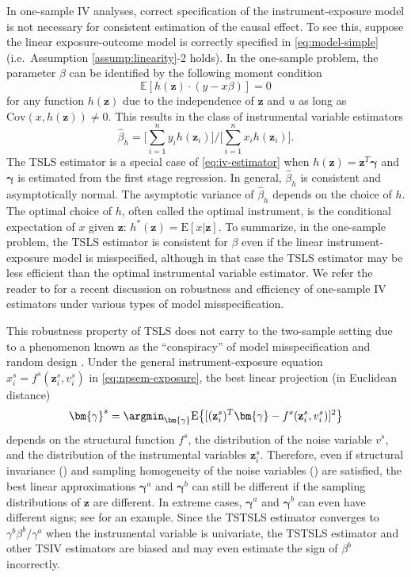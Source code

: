 \documentclass[preprint]{imsart}
\begin{document}
In one-sample IV analyses, correct specification of
the instrument-exposure model is not necessary for consistent
estimation of the causal effect. To see this, suppose the linear
exposure-outcome model is correctly specified in
\eqref{eq:model-simple} (i.e.\ Assumption \ref{assump:linearity}-2
holds). In the one-sample problem, the parameter $\beta$ can be
identified by the following moment condition
\[
\mathbb{E}[h(\mathbf{z}) \cdot (y - x \beta)] = 0
\]
for any function $h(\mathbf{z})$ due to the independence of
$\mathbf{z}$ and $u$ as long as $\mathrm{Cov}(x, h(\mathbf{z})) \ne
0$. This results in the class of instrumental
variable estimators
\begin{equation} \label{eq:iv-estimator}
  \hat{\beta}_h = \Big[\sum_{i=1}^n y_i
  h(\mathbf{z}_i)\Big] \Big/ \Big[\sum_{i=1}^n x_i h(\mathbf{z}_i)\Big].
\end{equation}
The TSLS estimator is a special case of \eqref{eq:iv-estimator} when
$h(\mathbf{z}) = \mathbf{z}^T \bm{\gamma}$ and $\bm{\gamma}$ is estimated from the first
stage regression. In general, $\hat{\beta}_h$ is consistent and
asymptotically normal. The asymptotic variance of $\hat{\beta}_h$ depends on the choice
of $h$. The optimal choice of $h$, often called the optimal
instrument, is the conditional expectation of $x$ given $\mathbf{z}$:
$h^{*}(\mathbf{z}) = \mathrm{E}[x|\mathbf{z}]$. To summarize, in the
one-sample problem, the TSLS estimator is consistent for $\beta$ even
if the linear instrument-exposure model is misspecified, although in
that case the TSLS estimator may be less efficient than the optimal instrumental
variable estimator. We refer the reader to
\citet{vansteelandt2015robustness} for a recent discussion on
robustness and efficiency of one-sample IV estimators under various
types of model misspecification.

This robustness property of TSLS does not carry to the two-sample
setting due to a phenomenon known as the ``conspiracy'' of model
misspecification and random design \citep{white1980using,buja2014models}. Under the
general instrument-exposure equation $x_i^s = f^s(\mathbf{z}_i^s,v_i^s)$
in \eqref{eq:npsem-exposure}, the best linear projection (in Euclidean distance)
\begin{equation} \label{eq:gamma-projection}
  \bm{\gamma}^s = \argmin_{\bm{\gamma}} \mathrm{E}\big\{[(\mathbf{z}_i^s)^T
  \bm{\gamma} - f^s(\mathbf{z}_i^s,v_i^s)]^2\big\}
\end{equation}
depends on the structural function $f^s$, the distribution of the noise
variable $v^s$, and the distribution of the instrumental variables
$\mathbf{z}_i^s$. Therefore, even if structural invariance
() and sampling homogeneity of the noise variables
() are satisfied, the best linear
approximations $\bm{\gamma}^a$ and
$\bm{\gamma}^b$ can still be different if the sampling distributions
of $\mathbf{z}$ are different. In extreme cases, $\bm{\gamma}^a$ and
$\bm{\gamma}^b$ can even have different signs; see
 for an example. Since the TSTSLS estimator
converges to $\gamma^b \beta^b / \gamma^a$ when the instrumental
variable is univariate, the TSTSLS estimator and other TSIV estimators
are biased and may even estimate the sign of $\beta^b$ incorrectly.
\end{document}
